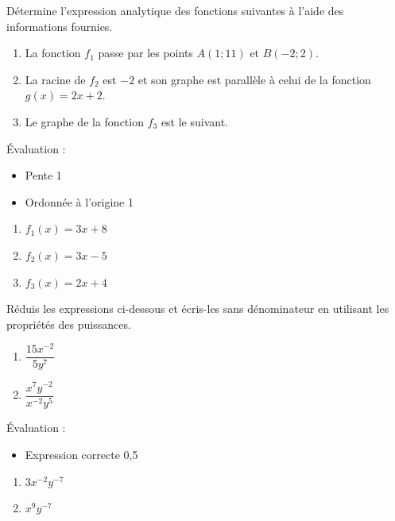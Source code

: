 \documentclass[a4paper, 12pt, parskip=half-, twoside=semi]{scrartcl}
\begin{document}
\begin{appliquer}[points=6]
    Détermine l'expression analytique des fonctions suivantes à l'aide des informations fournies.
    \begin{enumerate}
        \item La fonction $f_1$ passe par les points $A(1;11)$ et $B(-2;2)$.

        \item La racine de $f_2$ est $-2$ et son graphe est parallèle à celui de la fonction \\$g(x) = 2x + 2$.
        \item Le graphe de la fonction $f_3$ est le suivant. \hfil
    \end{enumerate}
\end{appliquer}
\begin{solution}
    Évaluation :
    \begin{itemize}
        \item Pente \hfill 1
        \item Ordonnée à l'origine \hfill 1
    \end{itemize}
    \begin{enumerate}[cols=3]
        \item $f_1(x) = 3x + 8$
        \item $f_2(x) = 3x - 5$
        \item $f_3(x) = 2x + 4$
    \end{enumerate}
\end{solution}

\newpage
\begin{appliquer}[points=2]
    Réduis les expressions ci-dessous  et écris-les sans dénominateur en utilisant les propriétés des puissances.
    \begin{enumerate}[cols=2]
        \item $\dfrac{15x^{-2}}{5y^7}$
        \item $\dfrac{x^7 y^{-2}}{x^{-2}y^5}$
    \end{enumerate}
\end{appliquer}
\begin{solution}
    Évaluation :
    \begin{itemize}
        \item Expression correcte \hfill 0,5
    \end{itemize}
    \begin{enumerate}[cols=2]
        \item $3x^{-2}y^{-7}$
        \item $x^9y^{-7}$
    \end{enumerate}
\end{solution}
\end{document}
